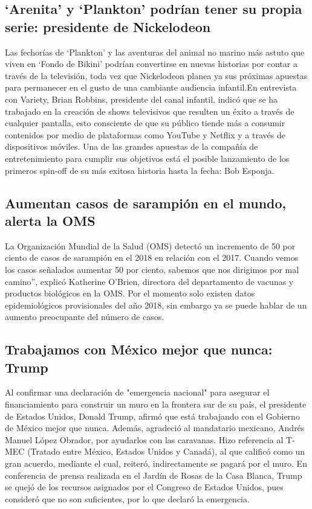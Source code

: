 \documentclass{mylib/reporte}
\begin{document}
\subsection{‘Arenita’ y ‘Plankton’ podrían tener su propia serie: presidente de Nickelodeon}
Las fechorías de ‘Plankton’ y las aventuras del animal no marino más astuto que viven en ‘Fondo de Bikini’ podrían convertirse en nuevas historias por contar a través de la televisión, toda vez que Nickelodeon planea ya sus próximas apuestas para permanecer en el gusto de una cambiante audiencia infantil.En entrevista con Variety, Brian Robbins, presidente del canal infantil, indicó que se ha trabajado en la creación de shows televisivos que resulten un éxito a través de cualquier pantalla, esto consciente de que su público tiende más a consumir contenidos por medio de plataformas como YouTube y Netflix y a través de dispositivos móviles.
Una de las grandes apuestas de la compañía de entretenimiento para cumplir sus objetivos está el posible lanzamiento de los primeros spin-off de su más exitosa historia hasta la fecha: Bob Esponja.


\subsection{Aumentan casos de sarampión en el mundo, alerta la OMS}
La Organización Mundial de la Salud (OMS) detectó un incremento de 50 por ciento de casos de sarampión en el 2018 en relación con el 2017.
Cuando vemos los casos señalados aumentar 50 por ciento, sabemos que nos dirigimos por mal camino”, explicó Katherine O’Brien, directora del departamento de vacunas y productos biológicos en la OMS.
Por el momento solo existen datos epidemiológicos provisionales del año 2018, sin embargo ya se puede hablar de un aumento preocupante del número de casos.

\subsection{Trabajamos con México mejor que nunca: Trump}

Al confirmar una declaración de "emergencia nacional" para asegurar el financiamiento para construir un muro en la frontera sur de su país, el presidente de Estados Unidos, Donald Trump, afirmó que está trabajando con el Gobierno de México mejor que nunca. Además, agradeció al mandatario mexicano, Andrés Manuel López Obrador, por ayudarlos con las caravanas.
Hizo referencia al T-MEC (Tratado entre México, Estados Unidos y Canadá), al que calificó como un gran acuerdo, mediante el cual, reiteró, indirectamente se pagará por el muro.
En conferencia de prensa realizada en el Jardín de Rosas de la Casa Blanca, Trump se quejó de los recursos asignados por el Congreso de Estados Unidos, pues consideró que no son suficientes, por lo que declaró la emergencia.
\end{document}
